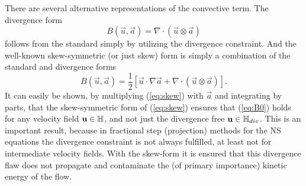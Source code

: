 There are several alternative representations of the convective term. The divergence form 
\begin{equation}
B(\vec{u},\vec{a})=\nabla \cdot (\vec{u} \otimes \vec{a})
\end{equation}
follows from the standard simply by utilizing the divergence constraint. And the well-known skew-symmetric (or just skew) form is simply a combination of the standard and divergence forms
\begin{equation}
 B(\vec{u},\vec{a}) = \frac{1}{2}\left[ \vec{u}\cdot \nabla \vec{a} + \nabla \cdot (\vec{u} \otimes \vec{a}) \right].
\label{eq:skew}
\end{equation}
It can easily be shown, by multiplying (\ref{eq:skew}) with $\vec{a}$ and integrating by parts, that the skew-symmetric form of (\ref{eq:skew}) ensures that (\ref{eq:B0}) holds for any velocity field $\mathbf{ u } \in \mathbb{H}$, and not just the divergence free $\mathbf{ u } \in \mathbb{H}_{div}$. This is an important result, because in fractional step (projection) methods for the NS equations the divergence constraint is not always fulfilled, at least not for intermediate velocity fields. With the skew-form it is ensured that this divergence flaw does not propagate and contaminate the (of primary importance) kinetic energy of the flow.


